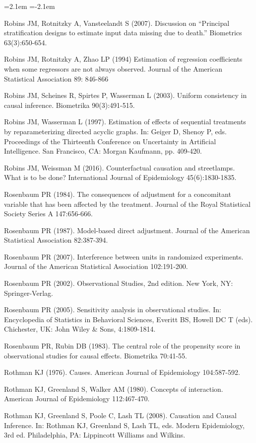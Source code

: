 \begin{list}{}{\leftmargin=2.1em   \itemindent=-2.1em \parsep=0pt \itemsep=1.6pt \topsep=4pt \rightmargin=0pt}
\item Robins JM, Rotnitzky A, Vansteelandt S (2007). Discussion on ``Principal stratification designs to estimate input data missing due to death.'' Biometrics 63(3):650-654.
\item Robins JM, Rotnitzky A, Zhao LP (1994) Estimation of regression coefficients when some regressors are not always observed. Journal of the American Statistical Association 89: 846-866
\item Robins JM, Scheines R, Spirtes P, Wasserman L (2003). Uniform consistency in causal inference. Biometrika 90(3):491-515.
\item Robins JM, Wasserman L (1997). Estimation of effects of sequential treatments by reparameterizing directed acyclic graphs. In: Geiger D, Shenoy P, eds. Proceedings of the Thirteenth Conference on Uncertainty in Artificial Intelligence. San Francisco, CA: Morgan Kaufmann, pp. 409-420.
\item Robins JM, Weissman M (2016). Counterfactual causation and streetlamps. What is to be done? International Journal of Epidemiology 45(6):1830-1835.
\item Rosenbaum PR (1984). The consequences of adjustment for a concomitant variable that has been affected by the treatment. Journal of the Royal Statistical Society Series A 147:656-666.
\item Rosenbaum PR (1987). Model-based direct adjustment. Journal of the American Statistical Association 82:387-394.
\item Rosenbaum PR (2007). Interference between units in randomized experiments. Journal of the American Statistical Association 102:191-200.
\item Rosenbaum PR (2002). Observational Studies, 2nd edition. New York, NY: Springer-Verlag.
\item Rosenbaum PR (2005). Sensitivity analysis in observational studies. In: Encyclopedia of Statistics in Behavioral Sciences, Everitt BS, Howell DC T (eds). Chichester, UK: John Wiley \& Sons, 4:1809-1814.
\item Rosenbaum PR, Rubin DB (1983). The central role of the propensity score in observational studies for causal effects. Biometrika 70:41-55.
\item Rothman KJ (1976). Causes. American Journal of Epidemiology 104:587-592.
\item Rothman KJ, Greenland S, Walker AM (1980). Concepts of interaction. American Journal of Epidemiology 112:467-470.
\item Rothman KJ, Greenland S, Poole C, Lash TL (2008). Causation and Causal Inference. In: Rothman KJ, Greenland S, Lash TL, eds. Modern Epidemiology, 3rd ed. Philadelphia, PA: Lippincott Williams and Wilkins.

\end{list}
